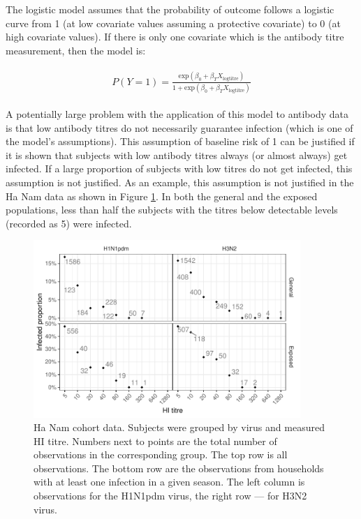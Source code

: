 \documentclass[12pt]{article}
\begin{document}
The logistic model assumes that the probability of outcome follows a logistic curve from 1 (at low covariate values assuming a protective covariate) to 0 (at high covariate values). If there is only one covariate which is the antibody titre measurement, then the model is:

\begin{align*}
\begin{gathered}
P(Y=1) = \frac{\text{exp}(\beta_0 + \beta_T X_{\text{logtitre}})}{1 + \text{exp}(\beta_0 + \beta_T X_{\text{logtitre}})}
\end{gathered}
\end{align*}

A potentially large problem with the application of this model to antibody data is that low antibody titres do not necessarily guarantee infection (which is one of the model's assumptions). This assumption of baseline risk of 1 can be justified if it is shown that subjects with low antibody titres always (or almost always) get infected. If a large proportion of subjects with low titres do not get infected, this assumption is not justified. As an example, this assumption is not justified in the Ha Nam data as shown in Figure \ref{HanamCounts}. In both the general and the exposed populations, less than half the subjects with the titres below detectable levels (recorded as 5) were infected. %

\begin{figure}[htp]
	\centering
	\includegraphics[width=0.9\textwidth]{../data-plot/hanam-hi-summ-light.pdf}
	\caption{
	Ha Nam cohort data. Subjects were grouped by virus and measured HI titre. Numbers next to points are the total number of observations in the corresponding group. The top row is all observations. The bottom row are the observations from households with at least one infection in a given season. The left column is observations for the H1N1pdm virus, the right row --- for H3N2 virus.
	}
	\label{HanamCounts}
\end{figure}
\end{document}
